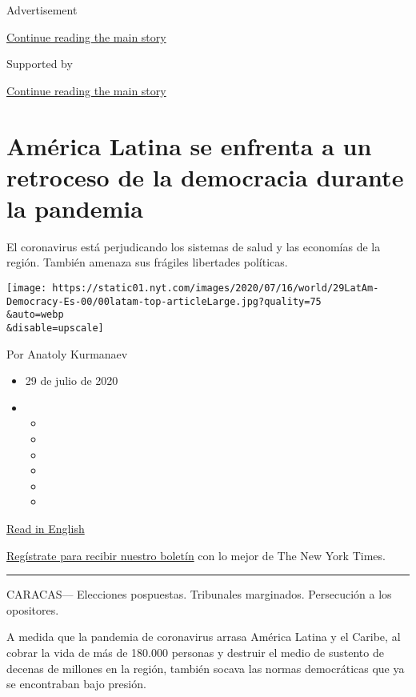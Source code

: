 Advertisement

\protect\hyperlink{after-top}{Continue reading the main story}

Supported by

\protect\hyperlink{after-sponsor}{Continue reading the main story}

\hypertarget{amuxe9rica-latina-se-enfrenta-a-un-retroceso-de-la-democracia-durante-la-pandemia}{%
\section{América Latina se enfrenta a un retroceso de la democracia
durante la
pandemia}\label{amuxe9rica-latina-se-enfrenta-a-un-retroceso-de-la-democracia-durante-la-pandemia}}

El coronavirus está perjudicando los sistemas de salud y las economías
de la región. También amenaza sus frágiles libertades políticas.

\texttt{[image: https://static01.nyt.com/images/2020/07/16/world/29LatAm-Democracy-Es-00/00latam-top-articleLarge.jpg?quality=75\\\&auto=webp\\\&disable=upscale]}

Por Anatoly Kurmanaev

\begin{itemize}
\item
  29 de julio de 2020
\item
  \begin{itemize}
  \item
  \item
  \item
  \item
  \item
  \item
  \end{itemize}
\end{itemize}

\href{https://www.nytimes.com/2020/07/29/world/americas/latin-america-democracy-pandemic.html}{Read
in English}

\href{https://www.nytimes.com/newsletters/el-times}{Regístrate para
recibir nuestro boletín} con lo mejor de The New York Times.

\begin{center}\rule{0.5\linewidth}{\linethickness}\end{center}

CARACAS--- Elecciones pospuestas. Tribunales marginados. Persecución a
los opositores.

A medida que la pandemia de coronavirus arrasa América Latina y el
Caribe, al cobrar la vida de más de 180.000 personas y destruir el medio
de sustento de decenas de millones en la región, también socava las
normas democráticas que ya se encontraban bajo presión.

